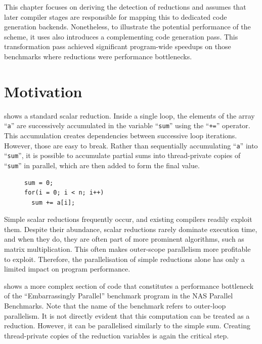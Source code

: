     This chapter focuses on deriving the detection of reductions and assumes
    that later compiler stages are responsible for mapping this to dedicated
    code generation backends.
    Nonetheless, to illustrate the potential performance of the scheme, it uses
    also introduces a complementing code generation pass.
    This transformation pass achieved significant program-wide speedups on those
    benchmarks where reductions were performance bottlenecks.

\section{Motivation}

     shows a standard scalar reduction.
    Inside a single loop, the elements of the array ``\texttt{a}'' are
    successively accumulated in the variable ``\texttt{sum}'' using the
    ``\texttt{+=}'' operator.
    This accumulation creates dependencies between successive loop iterations.
    However, those are easy to break.
    Rather than sequentially accumulating ``{\tt a}'' into ``{\tt sum}'', it is
    possible to accumulate partial sums into thread-private copies of
    ``\texttt{sum}'' in parallel, which are then added to form the final value.

\begin{figure}[h]
\begin{lstlisting}[language=MyCpp, label={sum-figure}, caption=
    {The most conventional example of a reduction is the adding up of values
     in an array:
     The reduction operator ``{\tt+}'' {\it reduces} the array ``\texttt{a}'' to
     a single value -- the reduction variable ``{\tt sum}''.}]
sum = 0;
for(i = 0; i < n; i++)
  sum += a[i];
\end{lstlisting}
\end{figure}

    Simple scalar reductions frequently occur, and existing compilers readily
    exploit them.
    Despite their abundance, scalar reductions rarely dominate execution time,
    and when they do, they are often part of more prominent algorithms, such as
    matrix multiplication.
    This often makes outer-scope parallelism more profitable to exploit.
    Therefore, the parallelisation of simple reductions alone has only a
    limited impact on program performance.

     shows a more complex section of code that
    constitutes a performance bottleneck of the ``Embarrassingly Parallel''
    benchmark program in the NAS Parallel Benchmarks.
    Note that the name of the benchmark refers to outer-loop parallelism.
    It is not directly evident that this computation can be treated as a
    reduction.
    However, it can be parallelised similarly to the simple sum.
    Creating thread-private copies of the reduction variables is again the
    critical step.

